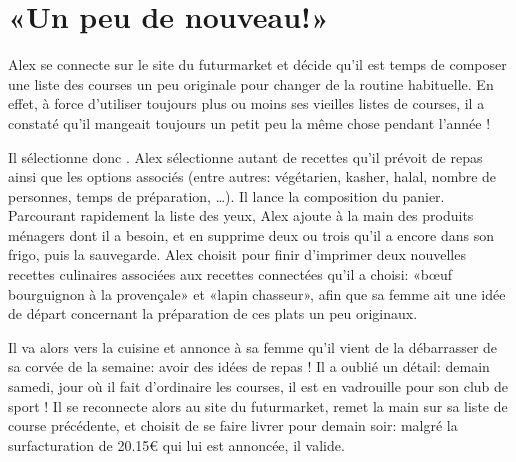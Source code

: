 \section{«Un peu de nouveau!»}
Alex se connecte sur le site du futurmarket et décide qu'il est temps de composer une liste des courses un peu originale pour changer de la routine habituelle.
En effet, à force d'utiliser toujours plus ou moins ses vieilles listes de courses, il a constaté qu'il mangeait toujours un petit peu la même chose pendant l'année !\par
Il sélectionne donc .
Alex sélectionne autant de recettes qu'il prévoit de repas ainsi que les options associés (entre autres: végétarien, kasher, halal, nombre de personnes, temps de préparation, \dots).
Il lance la composition du panier.
Parcourant rapidement la liste des yeux, Alex ajoute à la main des produits ménagers dont il a besoin, et en supprime deux ou trois qu'il a encore dans son frigo, puis la sauvegarde.
Alex choisit pour finir d'imprimer deux nouvelles recettes culinaires associées aux recettes connectées qu'il a choisi: «bœuf bourguignon à la provençale» et «lapin chasseur», afin que sa femme ait une idée de départ concernant la préparation de ces plats un peu originaux.
\par
Il va alors vers la cuisine et annonce à sa femme qu'il vient de la débarrasser de sa corvée de la semaine: avoir des idées de repas !
Il a oublié un détail: demain samedi, jour où il fait d'ordinaire les courses, il est en vadrouille pour son club de sport !
Il se reconnecte alors au site du futurmarket, remet la main sur sa liste de course précédente, et choisit de se faire livrer pour demain soir: malgré la surfacturation de 20.15€ qui lui est annoncée, il valide.
